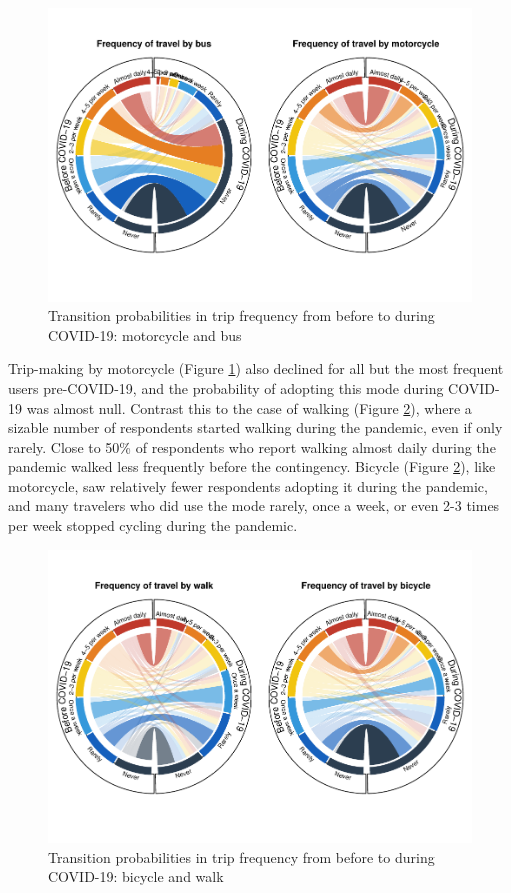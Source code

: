 \documentclass[]{elsarticle} %
\begin{document}
\begin{figure}
\centering
\includegraphics{Frequency-of-Travel-by-Mode-COVID-19-Bangladesh_files/figure-latex/circular-plots-transition-probabilities-3-1.pdf}
\caption{\label{fig:circular-plot-3}Transition probabilities in trip
frequency from before to during COVID-19: motorcycle and bus}
\end{figure}

Trip-making by motorcycle (Figure \ref{fig:circular-plot-3}) also
declined for all but the most frequent users pre-COVID-19, and the
probability of adopting this mode during COVID-19 was almost null.
Contrast this to the case of walking (Figure \ref{fig:circular-plot-4}),
where a sizable number of respondents started walking during the
pandemic, even if only rarely. Close to 50\% of respondents who report
walking almost daily during the pandemic walked less frequently before
the contingency. Bicycle (Figure \ref{fig:circular-plot-4}), like
motorcycle, saw relatively fewer respondents adopting it during the
pandemic, and many travelers who did use the mode rarely, once a week,
or even 2-3 times per week stopped cycling during the pandemic.

\begin{figure}
\centering
\includegraphics{Frequency-of-Travel-by-Mode-COVID-19-Bangladesh_files/figure-latex/circular-plots-transition-probabilities-4-1.pdf}
\caption{\label{fig:circular-plot-4}Transition probabilities in trip
frequency from before to during COVID-19: bicycle and walk}
\end{figure}
\end{document}
